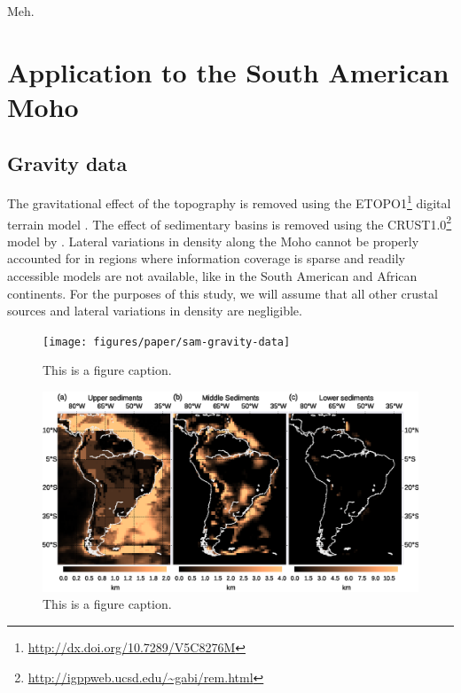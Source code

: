 \documentclass[extra]{gji}
\begin{document}
Meh.


\section{Application to the South American Moho}


\subsection{Gravity data}

The gravitational effect of the topography
is removed using the
ETOPO1\footnote{\url{http://dx.doi.org/10.7289/V5C8276M}}
digital terrain model
\citep{amante_c._and_b._w._eakins_etopo1_2009}.
The effect of sedimentary basins is removed using the
CRUST1.0\footnote{\url{http://igppweb.ucsd.edu/~gabi/rem.html}} model
by
\citet{laske_update_2013}.
Lateral variations in density along the Moho cannot be properly accounted for
in regions where information coverage is sparse and readily accessible models
are not available, like in the South American and African continents.
For the purposes of this study, we will assume that all other crustal sources
and lateral variations in density are negligible.


\begin{figure}
    \centering
    \texttt{[image: figures/paper/sam-gravity-data]}
    \caption{This is a figure caption.}
    \label{fig:sam-data}
\end{figure}

\begin{figure}
    \centering
    \includegraphics[width=\textwidth]{figures/paper/sam-gravity-sed}
    \caption{This is a figure caption.}
    \label{fig:sam-sed}
\end{figure}
\end{document}
